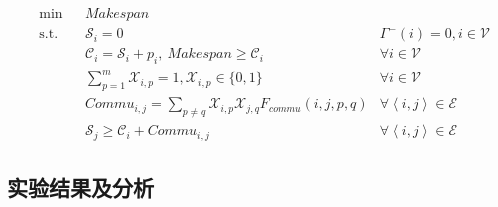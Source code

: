 \begin{align}
	& \text{min} & & \mathit{Makespan} \label{eq:p-target-2} & \\
	& \text{s.t.} & & \mathcal{S}_{i}=0 &\Gamma^{-}(i)=0, i\in \mathcal{V} \nonumber\\
	& & & \mathcal{C}_{i} = \mathcal{S}_{i} + \mathit{p}_i,\ \mathit{Makespan} \ge \mathcal{C}_{i} & \forall i\in \mathcal{V} \nonumber\\
	& & & \sum_{p=1}^{m} \mathcal{X}_{i,p}=1, \mathcal{X}_{i,p}\in\{0,1\} & \forall i\in \mathcal{V} \nonumber\\
	& & & \mathit{Commu}_{i,j} = \sum_{p\neq q}\mathcal{X}_{i,p}\mathcal{X}_{j,q}F_{\mathit{commu}}(i,j,p,q) & \forall \left\langle i,j\right\rangle \in \mathcal{E} \nonumber\\
	& & & \mathcal{S}_{j} \ge \mathcal{C}_{i} + \mathit{Commu}_{i,j}&\forall \left\langle i,j\right\rangle \in \mathcal{E} \nonumber
\end{align}







\subsection{实验结果及分析}


